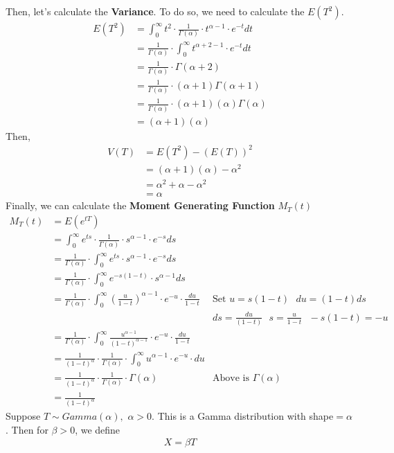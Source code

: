 \documentclass[11pt,oneside]{book}
\theoremstyle{break}
\theoremstyle{break}
\begin{document}
Then, let's calculate the \textbf{Variance}. To do so, we need to calculate the $E(T^2)$.\begin{align*}
E(T^2)&=\int_{0}^{\infty}t^2\cdot \frac{1}{\Gamma(\alpha)}\cdot t^{\alpha -1}\cdot e^{-t}dt\\
&=\frac{1}{\Gamma(\alpha)}\cdot \int_{0}^{\infty}t^{\alpha+2-1}\cdot e^{-t}dt\\
&=\frac{1}{\Gamma(\alpha)}\cdot \Gamma(\alpha+2)\\
&=\frac{1}{\Gamma(\alpha)}\cdot (\alpha+1) \Gamma(\alpha+1)\\
&=\frac{1}{\Gamma(\alpha)}\cdot (\alpha+1)(\alpha) \Gamma(\alpha)\\
&=(\alpha+1)(\alpha)
\end{align*}
Then, \begin{align*}
V(T)&=E(T^2)-(E(T))^2\\
&=(\alpha+1)(\alpha)-\alpha^2\\
&=\alpha^2+\alpha-\alpha^2\\
&=\alpha
\end{align*}
Finally, we can calculate the \textbf{Moment Generating Function} $M_T(t)$\begin{align*}
M_T(t)&=E(e^{tT})\\
&=\int_{0}^{\infty}e^{ts}\cdot \frac{1}{\Gamma(\alpha)}\cdot s^{\alpha -1}\cdot e^{-s}ds\\
&= \frac{1}{\Gamma(\alpha)}\cdot \int_{0}^{\infty}e^{ts}\cdot s^{\alpha -1}\cdot e^{-s}ds\\
&= \frac{1}{\Gamma(\alpha)}\cdot \int_{0}^{\infty}e^{-s(1-t)}\cdot s^{\alpha -1}ds\\
&= \frac{1}{\Gamma(\alpha)}\cdot \int_{0}^{\infty}\left( \frac{u}{1-t}\right)^{\alpha-1}\cdot e^{-u}\cdot \frac{du}{1-t}&\text{Set }u=s(1-t)\text{ }du=(1-t)ds\\
&&ds=\frac{du}{(1-t)}\text{ }s=\frac{u}{1-t}\text{ }-s(1-t)=-u\\
&= \frac{1}{\Gamma(\alpha)}\cdot \int_{0}^{\infty}\frac{u^{\alpha-1}}{(1-t)^{\alpha-1}}\cdot e^{-u}\cdot \frac{du}{1-t}\\
&= \frac{1}{(1-t)^{\alpha}}\cdot \frac{1}{\Gamma(\alpha)}\cdot \int_{0}^{\infty}u^{\alpha-1}\cdot e^{-u}\cdot du\\
&= \frac{1}{(1-t)^{\alpha}}\cdot \frac{1}{\Gamma(\alpha)}\cdot \Gamma(\alpha)&\text{Above is }\Gamma(\alpha)\\
&=\frac{1}{(1-t)^{\alpha}}
\end{align*}
Suppose $T\sim Gamma(\alpha),$ $\alpha>0$. This is a Gamma distribution with shape$=\alpha$. Then for $\beta>0$, we define \begin{align*}
X=\beta T
\end{align*}
\end{document}
